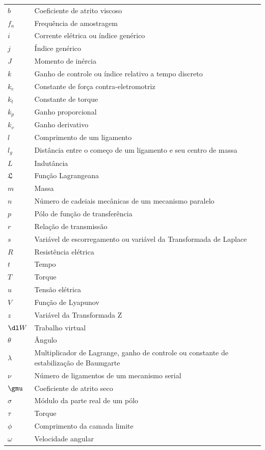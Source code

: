 \documentclass[]{politex}
\begin{document}
\begin{longtable}{lp{}}
  $b$ & Coeficiente de atrito viscoso \\
  $f_a$ & Frequência de amostragem \\
  $i$ & Corrente elétrica ou índice genérico \\
  $j$ & Índice genérico \\
  $J$ & Momento de inércia \\
  $k$ & Ganho de controle ou índice relativo a tempo discreto \\
  $k_e$ & Constante de força contra-eletromotriz \\
  $k_t$ & Constante de torque \\
  $k_p$ & Ganho proporcional \\
  $k_v$ & Ganho derivativo \\
  $l$ & Comprimento de um ligamento \\
  $l_g$ & Distância entre o começo de um ligamento e seu centro de massa \\
  $L$ & Indutância \\
  $\mathfrak{L}$ & Função Lagrangeana \\
  $m$ & Massa \\
  $n$ & Número de cadeiais mecânicas de um mecanismo paralelo \\
  $p$ & Pólo de função de transferência \\
  $r$ & Relação de transmissão \\
  $s$ & Variável de escorregamento ou variável da Transformada de Laplace \\
  $R$ & Resistência elétrica \\
  $t$ & Tempo \\
  $T$ & Torque \\
  $u$ & Tensão elétrica \\
  $V$ & Função de Lyapunov \\
  $z$ & Variável da Transformada Z \\
  $\dl W$ & Trabalho virtual \\
  $\theta$ & Ângulo \\
  $\lambda$ & Multiplicador de Lagrange, ganho de controle ou constante de estabilização de Baumgarte \\
  $\nu$ & Número de ligamentos de um mecanismo serial \\
  $\gmu$ & Coeficiente de atrito seco \\
  $\sigma$ & Módulo da parte real de um pólo \\
  $\tau$ & Torque \\
  $\phi$ & Comprimento da camada limite \\
  $\omega$ & Velocidade angular \\
\end{longtable}
\end{document}
